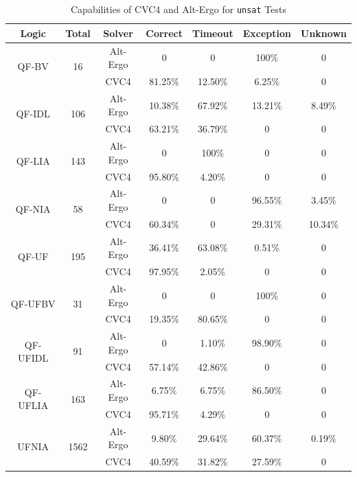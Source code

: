 \documentclass[10pt,letter]{article}
\theoremstyle{definition}
\begin{document}
\begin{table}[!ht]
\small
\centering
\begin{tabular}{|cc|c|cccc|}
\hline
 \bf Logic & \bf Total &\bf Solver &\bf Correct &\bf Timeout &\bf Exception & \bf Unknown\\\hline
  \multirow{2}{*}{QF-BV} & \multirow{2}{*}{16} & Alt-Ergo & 0 & 0 & 100\% & 0\\
  & & CVC4 & 81.25\% & 12.50\% & 6.25\% & 0\\\hline
  \multirow{2}{*}{QF-IDL} & \multirow{2}{*}{106} & Alt-Ergo & 10.38\% & 67.92\% & 13.21\% & 8.49\%\\
  &  & CVC4 & 63.21\% & 36.79\% & 0 & 0\\\hline
  \multirow{2}{*}{QF-LIA} & \multirow{2}{*}{143} & Alt-Ergo & 0 & 100\% & 0 & 0\\
  &  & CVC4 & 95.80\% & 4.20\% & 0 & 0\\\hline
  \multirow{2}{*}{QF-NIA} & \multirow{2}{*}{58} & Alt-Ergo & 0 & 0 & 96.55\% & 3.45\%\\
  &  & CVC4 & 60.34\% & 0 & 29.31\% & 10.34\%\\\hline
  \multirow{2}{*}{QF-UF} & \multirow{2}{*}{195} & Alt-Ergo & 36.41\% & 63.08\% & 0.51\% & 0\\
  &  & CVC4 & 97.95\% & 2.05\% & 0 & 0\\\hline
  \multirow{2}{*}{QF-UFBV} & \multirow{2}{*}{31} & Alt-Ergo & 0 & 0 & 100\% & 0\\
  &  & CVC4 & 19.35\% & 80.65\% & 0 & 0\\\hline
  \multirow{2}{*}{QF-UFIDL} & \multirow{2}{*}{91} & Alt-Ergo & 0 & 1.10\% & 98.90\% & 0\\
  &  & CVC4 & 57.14\% & 42.86\% & 0 & 0\\\hline
  \multirow{2}{*}{QF-UFLIA} & \multirow{2}{*}{163} & Alt-Ergo & 6.75\% & 6.75\% & 86.50\% & 0\\
  &  & CVC4 & 95.71\% & 4.29\% & 0 & 0\\\hline
  \multirow{2}{*}{UFNIA} & \multirow{2}{*}{1562} & Alt-Ergo & 9.80\% & 29.64\% & 60.37\% & 0.19\%\\
  &  & CVC4 & 40.59\% & 31.82\% & 27.59\% & 0\\\hline
\end{tabular}
\caption{Capabilities of CVC4 and Alt-Ergo for {\tt unsat} Tests}
\label{t:result}
\end{table}
\end{document}
